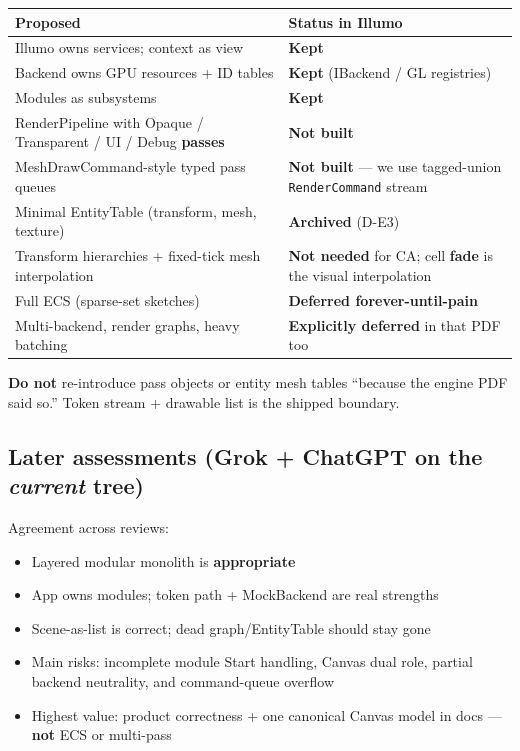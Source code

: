 \documentclass[10pt,a4paper]{article}
\begin{document}
\begin{table}[h!]
\centering
\small
\begin{tabularx}{\textwidth}{l X}
\toprule
\textbf{Proposed} & \textbf{Status in Illumo} \\
\midrule
Illumo owns services; context as view & \textbf{Kept} \\
Backend owns GPU resources + ID tables & \textbf{Kept} (IBackend / GL registries) \\
Modules as subsystems & \textbf{Kept} \\
RenderPipeline with Opaque / Transparent / UI / Debug \textbf{passes} & \textbf{Not built} \\
MeshDrawCommand-style typed pass queues & \textbf{Not built} --- we use tagged-union \texttt{RenderCommand} stream \\
Minimal EntityTable (transform, mesh, texture) & \textbf{Archived} (D-E3) \\
Transform hierarchies + fixed-tick mesh interpolation & \textbf{Not needed} for CA; cell \textbf{fade} is the visual interpolation \\
Full ECS (sparse-set sketches) & \textbf{Deferred forever-until-pain} \\
Multi-backend, render graphs, heavy batching & \textbf{Explicitly deferred} in that PDF too \\
\bottomrule
\end{tabularx}
\end{table}

\noindent \textbf{Do not} re-introduce pass objects or entity mesh tables ``because the engine PDF said so.'' Token stream + drawable list is the shipped boundary.

\subsection{Later assessments (Grok + ChatGPT on the \textit{current} tree)}
Agreement across reviews:
\begin{itemize}
    \item Layered modular monolith is \textbf{appropriate}
    \item App owns modules; token path + MockBackend are real strengths
    \item Scene-as-list is correct; dead graph/EntityTable should stay gone
    \item Main risks: incomplete module Start handling, Canvas dual role, partial backend neutrality, and command-queue overflow
    \item Highest value: product correctness + one canonical Canvas model in docs --- \textbf{not} ECS or multi-pass
\end{itemize}
\end{document}
